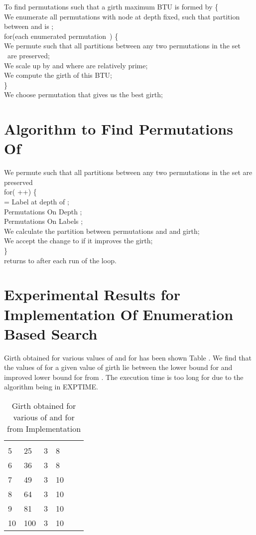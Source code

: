 \documentclass{llncs}
\begin{document}
To find permutations  such that a girth maximum   BTU is formed by   \{  \\
We enumerate all permutations   with node at depth  fixed,
such that partition between    and 
 is  ; \\
for(each enumerated permutation\   ) \{ \\
We permute  such that all partitions between any two permutations in the set \   are preserved;  \\
We scale up  by   and   where   are relatively prime; \\
We compute the girth of this  BTU; \\
\} \\
We choose permutation  that gives us the best girth;

\section {Algorithm to Find Permutations Of }
We permute   such that all partitions between any two permutations in the set   are preserved \\
for( ++) \{  \\
  = Label at depth   of  ; \\
Permutations On Depth ; \\
Permutations On Labels ; \\
We calculate the partition between permutations   and   and girth; \\
We accept the change to    if it improves the girth; \\
\} \\
  returns to   after each run of the loop.

\section {Experimental Results for Implementation Of Enumeration Based Search}
Girth obtained for various values of   and  for   has been shown Table  . We find that the values of  for a given value of girth  lie between the lower bound for  and improved lower bound for  from . The execution time is too long for  due to the algorithm being in EXPTIME.

\begin{table}
\caption{Girth obtained for various of  and for  from Implementation}
\begin{tabular}{llllll}
\hline\noalign{\smallskip}
 &  &  &  \\
\noalign{\smallskip}
\hline
\noalign{\smallskip}
5 & 25 & 3 & 8 \\
6 & 36 & 3 & 8  \\
7 & 49 & 3 & 10 \\
8 & 64 & 3 & 10 \\
9 & 81 & 3 & 10  \\
10 & 100 & 3 & 10 \\
\hline
\end{tabular}
\end{table}
\end{document}
